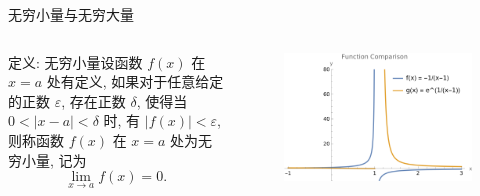 \documentclass[
10pt,  
aspectratio=43,  
]{beamer}
\begin{document}
\begin{frame}[c]{无穷小量与无穷大量}
	
\begin{columns}[onlytextwidth]
\begin{block}{定义: 无穷小量}设函数 $f(x)$ 在 $x=a$ 处有定义,  如果对于任意给定的正数 $\varepsilon$,  存在正数 $\delta$,  使得当 $0 < |x-a| < \delta$ 时,  有 $|f(x)| < \varepsilon$,  则称函数 $f(x)$ 在 $x=a$ 处为无穷小量,  记为
\begin{equation*}
\lim_{x\to a}f(x) = 0.
\end{equation*}
\end{block}

\begin{figure}
    \centering
    \includegraphics[width=0.8\linewidth]{infinity2.png}

\end{figure}
\end{columns}
\end{frame}	
\end{document}
